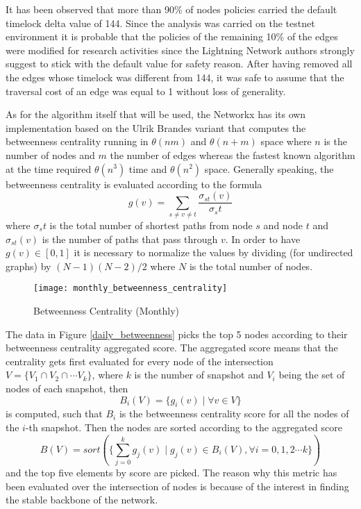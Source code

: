 	It has been observed that more than 90\% of nodes policies carried the default timelock delta value of 144. Since the analysis was carried on the testnet environment it is probable that the policies of the remaining 10\% of the edges were modified for research activities since the Lightning Network authors strongly suggest to stick with the default value for safety reason. After having removed all the edges whose timelock was different from 144, it was safe to assume that the traversal cost of an edge was equal to 1 without loss of generality.
	
	
	As for the algorithm itself that will be used, the Networkx has its own implementation based on the Ulrik Brandes \cite{Brandes2001} variant that computes the betweenness centrality running in $\theta(nm)$ and $\theta(n + m)$ space where $n$ is the number of nodes and $m$ the number of edges whereas the fastest known algorithm at the time required $\theta(n^3)$ time and $\theta(n^2)$ space.	Generally speaking, the betweenness centrality is evaluated according to the formula 
	\begin{equation}
		g(v) = \sum_{s \neq v \neq t}{\frac{\sigma_{st}(v) }{\sigma_st}}
	\end{equation}
	where $\sigma_st$ is the total number of shortest paths from node $s$ and node $t$ and $\sigma_{st}(v)$ is the number of paths that pass through $v$. In order to have $g(v) \in [0, 1]$ it is necessary to normalize the values by dividing (for undirected graphs) by $(N-1)(N-2)/2$ where $N$ is the total number of nodes.
	
	\begin{figure}
		\centering
		\texttt{[image: monthly\_betweenness\_centrality]}
		\caption{Betweenness Centrality (Monthly)}
		\label{monthly_betweenness_centrality}
	\end{figure}		
	
	The data in Figure \ref{daily_betweenness} picks the top 5 nodes according to their betweenness centrality aggregated score. The aggregated score means that the centrality gets first evaluated for every node of the intersection $V = \{V_1 \cap V_2 \cap \cdots V_k \}$, where $k$ is the number of snapshot and $V_i$ being the set of nodes of each snapshot, then
	\begin{equation}\label{eq:betwenness}
		B_i(V) = \{ g_i(v) \mid \forall v \in V \}
	\end{equation}
	is computed, such that $B_i$ is the betweenness centrality score for all the nodes of the $i$-th snapshot. Then the nodes are sorted according to the aggregated score
	\begin{equation}
		B(V) = sort(\{ \sum_{j = 0}^{k}g_j(v) \mid g_j(v) \in B_i(V), \forall i= 0,1,2 \cdots k\})
	\end{equation}
	and the top five elements by score are picked. The reason why this metric has been evaluated over the intersection of nodes is because of the interest in finding the stable backbone of the network.
	
